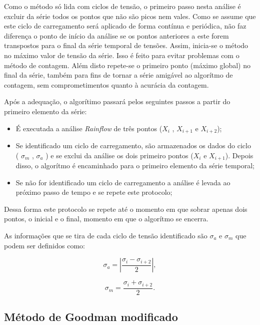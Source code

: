 Como o método só lida com ciclos de tensão, o primeiro passo nesta análise é excluir da série todos os pontos que não são picos nem vales. Como se assume que este ciclo de carregamento será aplicado de forma contínua e periódica, não faz diferença o ponto de início da análise se os pontos anteriores a este forem transpostos para o final da série temporal de tensões. Assim, inicia-se o método no máximo valor de tensão da série. Isso é feito para evitar problemas com o método de contagem. Além disto repete-se o primeiro ponto (máximo global) no final da série, também para fins de tornar a série amigável ao algorítmo de contagem, sem comprometimentos quanto à acurácia da contagem.

Após a adequação, o algorítimo passará pelos seguintes passos a partir do primeiro elemento da série:
\begin{itemize}
    \item É executada a análise \emph{Rainflow} de três pontos ($X_i$ , $X_{i+1}$ e $X_{i+2}$);
    \item Se identificado um ciclo de carregamento, são armazenados os dados do ciclo ( $\sigma_{m}$ , $\sigma_{a}$ ) e se exclui da análise os dois primeiro pontos ($X_i$ e $X_{i+1}$). Depois disso, o algorítmo é encaminhado para o primeiro elemento da série temporal;
    \item Se não for identificado um ciclo de carregamento a análise é levada ao próximo passo de tempo e se repete este protocolo;    
\end{itemize}

Dessa forma este protocolo se repete até o momento em que sobrar apenas dois pontos, o inicial e o final, momento em que o algorítmo se encerra.
 
As informações que se tira de cada ciclo de tensão identificado são $\sigma_{a}$ e $\sigma_{m}$ que podem ser definidos como:

\begin{equation}\label{eq.1}
    \sigma_a = \left| \frac{\sigma_{i} - \sigma_{i+2}}{2} \right|,
\end{equation}

\begin{equation}\label{eq.2}
    \sigma_m = \frac{\sigma_{i} + \sigma_{i+2}}{2}.
\end{equation}

\subsection{Método de Goodman modificado}

